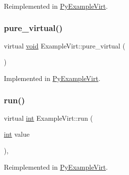 Reimplemented in \mbox{\hyperlink{class_py_example_virt_a55adfa6f3ddabdfa860a4593ce39e5d2}{Py\+Example\+Virt}}.

\mbox{\label{class_example_virt_a515529fab251071921dc865f2075f920}} 
\subsubsection{\texorpdfstring{pure\_virtual()}{pure\_virtual()}}
{\footnotesize\ttfamily virtual \mbox{\hyperlink{_s_d_l__opengles2__gl2ext_8h_ae5d8fa23ad07c48bb609509eae494c95}{void}} Example\+Virt\+::pure\+\_\+virtual (\begin{DoxyParamCaption}{ }\end{DoxyParamCaption})\hspace{0.3cm}{\ttfamily [pure virtual]}}



Implemented in \mbox{\hyperlink{class_py_example_virt_a1ab7aed255c6c2ed1f5c2e287efe1847}{Py\+Example\+Virt}}.

\mbox{\label{class_example_virt_a912c8aeca102f6654bfd3746c7b90fd9}} 
\subsubsection{\texorpdfstring{run()}{run()}}
{\footnotesize\ttfamily virtual \mbox{\hyperlink{warnings_8h_a74f207b5aa4ba51c3a2ad59b219a423b}{int}} Example\+Virt\+::run (\begin{DoxyParamCaption}\item[{\mbox{\hyperlink{warnings_8h_a74f207b5aa4ba51c3a2ad59b219a423b}{int}}}]{value }\end{DoxyParamCaption})\hspace{0.3cm}{\ttfamily [inline]}, {\ttfamily [virtual]}}



Reimplemented in \mbox{\hyperlink{class_py_example_virt_a3052c214b7978396f0c4cbbebe8a8fef}{Py\+Example\+Virt}}.

\mbox{\label{class_example_virt_a9c70a3e16f56f6bafe352415cec884ff}} 
